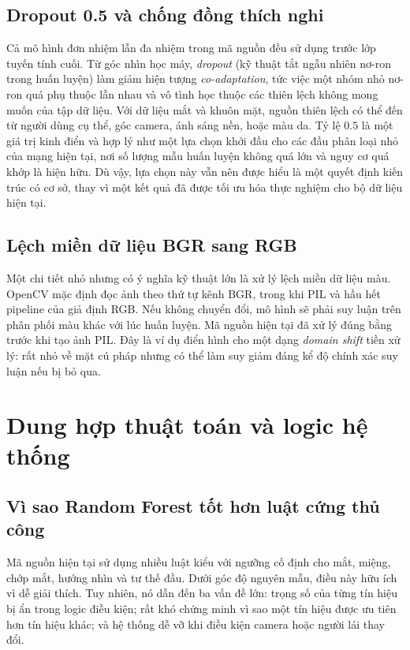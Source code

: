 \documentclass[12pt,a4paper]{article}
\begin{document}
\subsection{Dropout 0.5 và chống đồng thích nghi}
Cả mô hình đơn nhiệm lẫn đa nhiệm trong mã nguồn đều sử dụng  trước lớp tuyến tính cuối. Từ góc nhìn học máy, \textit{dropout} (kỹ thuật tắt ngẫu nhiên nơ-ron trong huấn luyện) làm giảm hiện tượng \textit{co-adaptation}, tức việc một nhóm nhỏ nơ-ron quá phụ thuộc lẫn nhau và vô tình học thuộc các thiên lệch không mong muốn của tập dữ liệu. Với dữ liệu mắt và khuôn mặt, nguồn thiên lệch có thể đến từ người dùng cụ thể, góc camera, ánh sáng nền, hoặc màu da. Tỷ lệ \(0.5\) là một giá trị kinh điển và hợp lý như một lựa chọn khởi đầu cho các đầu phân loại nhỏ của mạng hiện tại, nơi số lượng mẫu huấn luyện không quá lớn và nguy cơ quá khớp là hiện hữu. Dù vậy, lựa chọn này vẫn nên được hiểu là một quyết định kiến trúc có cơ sở, thay vì một kết quả đã được tối ưu hóa thực nghiệm cho bộ dữ liệu hiện tại.

\subsection{Lệch miền dữ liệu BGR sang RGB}
Một chi tiết nhỏ nhưng có ý nghĩa kỹ thuật lớn là xử lý lệch miền dữ liệu màu. OpenCV mặc định đọc ảnh theo thứ tự kênh BGR, trong khi PIL và hầu hết pipeline của  giả định RGB. Nếu không chuyển đổi, mô hình sẽ phải suy luận trên phân phối màu khác với lúc huấn luyện. Mã nguồn hiện tại đã xử lý đúng bằng  trước khi tạo ảnh PIL. Đây là ví dụ điển hình cho một dạng \textit{domain shift} tiền xử lý: rất nhỏ về mặt cú pháp nhưng có thể làm suy giảm đáng kể độ chính xác suy luận nếu bị bỏ qua.

\section{Dung hợp thuật toán và logic hệ thống}
\subsection{Vì sao Random Forest tốt hơn luật cứng thủ công}
Mã nguồn hiện tại sử dụng nhiều luật kiểu  với ngưỡng cố định cho mắt, miệng, chớp mắt, hướng nhìn và tư thế đầu. Dưới góc độ nguyên mẫu, điều này hữu ích vì dễ giải thích. Tuy nhiên, nó dẫn đến ba vấn đề lớn: trọng số của từng tín hiệu bị ẩn trong logic điều kiện; rất khó chứng minh vì sao một tín hiệu được ưu tiên hơn tín hiệu khác; và hệ thống dễ vỡ khi điều kiện camera hoặc người lái thay đổi.
\end{document}
